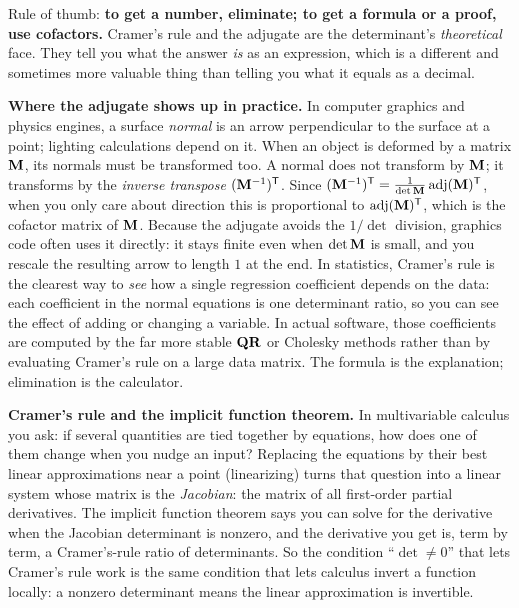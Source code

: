 \begin{focusbox}
Rule of thumb: \textbf{to get a number, eliminate; to get a formula or a proof, use cofactors.}
Cramer's rule and the adjugate are the determinant's \emph{theoretical} face. They tell you what the
answer \emph{is} as an expression, which is a different and sometimes more valuable thing than telling
you what it equals as a decimal.
\end{focusbox}

\begin{applicationbox}
\textbf{Where the adjugate shows up in practice.} In computer graphics and physics
engines, a surface \emph{normal} is an arrow perpendicular to the surface at a point; lighting
calculations depend on it. When an object is deformed by a matrix $\mathbf{M}$, its normals must be
transformed too. A normal does not transform by $\mathbf{M}$; it transforms by the \emph{inverse
transpose} $(\mathbf{M}^{-1})^{\mathsf{T}}$. Since $(\mathbf{M}^{-1})^{\mathsf{T}}=\frac{1}{\det\mathbf{M}}\operatorname{adj}(\mathbf{M})^{\mathsf{T}}$,
when you only care about direction this is proportional to $\operatorname{adj}(\mathbf{M})^{\mathsf{T}}$, which is
the cofactor matrix of $\mathbf{M}$. Because the adjugate avoids the $1/\det$ division, graphics code
often uses it directly: it stays finite even when $\det\mathbf{M}$ is small, and you rescale the
resulting arrow to length $1$ at the end. In statistics, Cramer's rule is the clearest way to
\emph{see} how a single regression coefficient depends on the data: each coefficient in the normal
equations is one determinant ratio, so you can see the effect of adding or changing a variable. In
actual software, those coefficients are computed by the far more stable $\mathbf{Q}\mathbf{R}$ or Cholesky
methods rather than by evaluating Cramer's rule on a large data matrix. The formula is the
explanation; elimination is the calculator.
\end{applicationbox}

\begin{connectionbox}
\textbf{Cramer's rule and the implicit function theorem.} In multivariable calculus you ask: if
several quantities are tied together by equations, how does one of them change when you nudge an
input? Replacing the equations by their best linear approximations near a point (linearizing) turns
that question into a linear system whose matrix is the \emph{Jacobian}: the matrix of all
first-order partial derivatives. The implicit function theorem says you can solve for the
derivative when the Jacobian determinant is nonzero, and the derivative you get is, term by term, a
Cramer's-rule ratio of determinants. So the condition ``$\det\neq0$'' that lets Cramer's rule work
is the same condition that lets calculus invert a function locally: a nonzero determinant means the
linear approximation is invertible.
\end{connectionbox}

